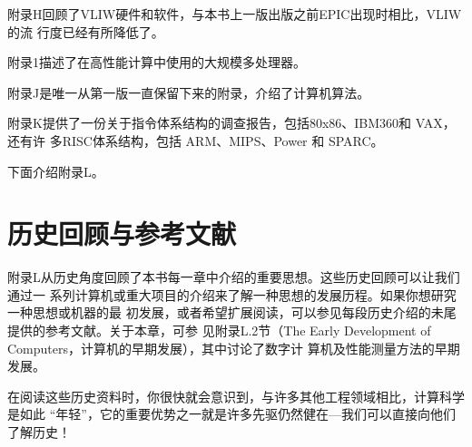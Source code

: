 附录H回顾了VLIW硬件和软件，与本书上一版出版之前EPIC出现时相比，VLIW 的流
行度已经有所降低了。

附录1描述了在高性能计算中使用的大规模多处理器。

附录J是唯一从第一版一直保留下来的附录，介绍了计算机算法。

附录K提供了一份关于指令体系结构的调查报告，包括80x86、IBM360和 VAX，还有许
多RISC体系结构，包括 ARM、MIPS、Power 和 SPARC。

下面介绍附录L。

\section{历史回顾与参考文献}
附录L从历史角度回顾了本书每一章中介绍的重要思想。这些历史回顾可以让我们通过一
系列计算机或重大项目的介绍来了解一种思想的发展历程。如果你想研究一种思想或机器的最
初发展，或者希望扩展阅读，可以参见每段历史介绍的未尾提供的参考文献。关于本章，可参
见附录L.2节（The Early Development of Computers，计算机的早期发展），其中讨论了数字计
算机及性能测量方法的早期发展。

在阅读这些历史资料时，你很快就会意识到，与许多其他工程领域相比，计算科学是如此
“年轻”，它的重要优势之一就是许多先驱仍然健在—我们可以直接向他们了解历史！

